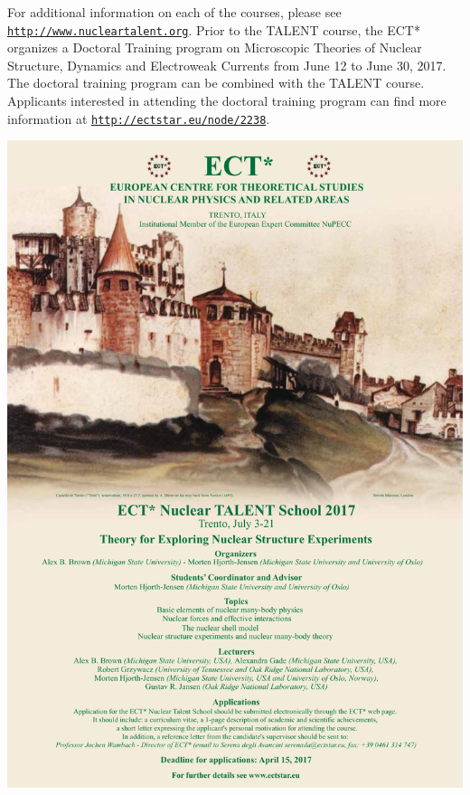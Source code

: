 \documentclass[%
oneside,                 %
final,                   %
10pt]{article}
\begin{document}
For additional information on each of the courses, please see
\href{{http://www.nucleartalent.org}}{\nolinkurl{http://www.nucleartalent.org}}. Prior to the TALENT course, the ECT* organizes 
a Doctoral Training program on Microscopic Theories of Nuclear Structure, Dynamics and 
Electroweak Currents from June 12 to June 30, 2017. 
The doctoral training program can be combined with the TALENT course.
Applicants interested in attending the doctoral training program can find more information at
\href{{http://ectstar.eu/node/2238}}{\nolinkurl{http://ectstar.eu/node/2238}}.





\vspace{6mm}

\centerline{\includegraphics[width=1.0\linewidth]{Poster.pdf}}

\vspace{6mm}





\end{document}
